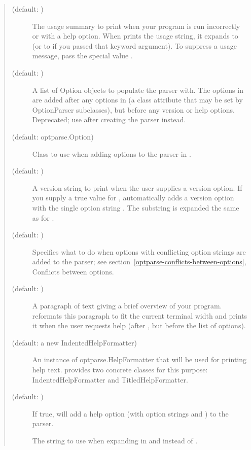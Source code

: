 \begin{quote}
\begin{description}
\item[ (default: )]
The usage summary to print when your program is run incorrectly or
with a help option.  When  prints the usage string, it expands
 to  (or to  if
you passed that keyword argument).  To suppress a usage message,
pass the special value .
\item[ (default: \code{{[}]})]
A list of Option objects to populate the parser with.  The options
in  are added after any options in
 (a class attribute that may be set by
OptionParser subclasses), but before any version or help options.
Deprecated; use  after creating the parser instead.
\item[ (default: optparse.Option)]
Class to use when adding options to the parser in .
\item[ (default: )]
A version string to print when the user supplies a version option.
If you supply a true value for ,  automatically adds
a version option with the single option string .  The
substring  is expanded the same as for .
\item[ (default: )]
Specifies what to do when options with conflicting option strings
are added to the parser; see section~\ref{optparse-conflicts-between-options}, Conflicts between options.
\item[ (default: )]
A paragraph of text giving a brief overview of your program.  
reformats this paragraph to fit the current terminal width and
prints it when the user requests help (after , but before
the list of options).
\item[ (default: a new IndentedHelpFormatter)]
An instance of optparse.HelpFormatter that will be used for
printing help text.   provides two concrete classes for this
purpose: IndentedHelpFormatter and TitledHelpFormatter.
\item[ (default: )]
If true,  will add a help option (with option strings 
and ) to the parser.
\item[]
The string to use when expanding  in  and
 instead of .
\end{description}
\end{quote}


